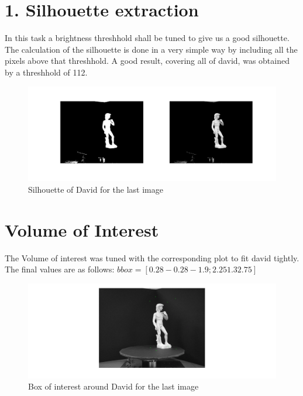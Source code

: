 \documentclass[12pt]{article}
\begin{document}
\maketitle


\section{1.  Silhouette extraction  }

In this task a brightness threshhold shall be tuned to give us a good silhouette. The calculation of the silhouette is done in a very simple way by including all the pixels above that threshhold. A good result, covering all of david, was obtained by a threshhold of 112. 

\vspace{5mm}
\begin{figure}[H]
	\centering
	\includegraphics[width=1.1\textwidth]{1.jpg}
	\caption{Silhouette of David for the last image}
	\label{fig1}
\end{figure}
\vspace{5mm}

\section{ Volume of Interest }

The Volume of interest was tuned with the corresponding plot to fit david tightly. The final values are as follows:
$bbox = [0.28 -0.28 -1.9; 2.25 1.3 2.75]$

\vspace{5mm}
\begin{figure}[H]
	\centering
	\includegraphics[width=1.1\textwidth]{2.jpg}
	\caption{Box of interest around David for the last image}
	\label{fig1}
\end{figure}
\vspace{5mm}
\end{document}
